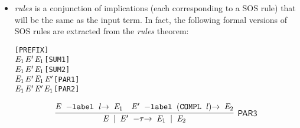 \begin{itemize}
  \item
\emph{rules} is a conjunction of implications (each
    corresponding to a SOS rule) that will be the
    same as the input term.
In fact, the following formal versions of SOS rules are
    extracted from the \emph{rules} theorem:
\begin{alltt}
\HOLTokenTurnstile{} \HOLSymConst{\ensuremath{\ldotp}} \HOLTokenTransBegin{}\HOLTokenTransEnd {}\hfill\texttt{[PREFIX]}
\HOLTokenTurnstile{}  \HOLTokenTransBegin{}\HOLTokenTransEnd \ensuremath{\HOLFreeVar{E}\sb{\mathrm{1}}} \HOLSymConst{\HOLTokenImp{}}  \HOLSymConst{\ensuremath{+}} \ensuremath{\HOLFreeVar{E}\sp{\prime}} \HOLTokenTransBegin{}\HOLTokenTransEnd \ensuremath{\HOLFreeVar{E}\sb{\mathrm{1}}}\hfill\texttt{[SUM1]}
\HOLTokenTurnstile{}  \HOLTokenTransBegin{}\HOLTokenTransEnd \ensuremath{\HOLFreeVar{E}\sb{\mathrm{1}}} \HOLSymConst{\HOLTokenImp{}} \ensuremath{\HOLFreeVar{E}\sp{\prime}} \HOLSymConst{\ensuremath{+}}  \HOLTokenTransBegin{}\HOLTokenTransEnd \ensuremath{\HOLFreeVar{E}\sb{\mathrm{1}}}\hfill\texttt{[SUM2]}
\HOLTokenTurnstile{}  \HOLTokenTransBegin{}\HOLTokenTransEnd \ensuremath{\HOLFreeVar{E}\sb{\mathrm{1}}} \HOLSymConst{\HOLTokenImp{}}  \HOLSymConst{\ensuremath{\mid}} \ensuremath{\HOLFreeVar{E}\sp{\prime}} \HOLTokenTransBegin{}\HOLTokenTransEnd \ensuremath{\HOLFreeVar{E}\sb{\mathrm{1}}} \HOLSymConst{\ensuremath{\mid}} \ensuremath{\HOLFreeVar{E}\sp{\prime}}\hfill\texttt{[PAR1]}
\HOLTokenTurnstile{}  \HOLTokenTransBegin{}\HOLTokenTransEnd \ensuremath{\HOLFreeVar{E}\sb{\mathrm{1}}} \HOLSymConst{\HOLTokenImp{}} \ensuremath{\HOLFreeVar{E}\sp{\prime}} \HOLSymConst{\ensuremath{\mid}}  \HOLTokenTransBegin{}\HOLTokenTransEnd \ensuremath{\HOLFreeVar{E}\sp{\prime}} \HOLSymConst{\ensuremath{\mid}} \ensuremath{\HOLFreeVar{E}\sb{\mathrm{1}}}\hfill\texttt{[PAR2]}
\end{alltt}
\begin{equation*}
\infer[\HOLRuleName{PAR3}]{\HOLinline{\HOLFreeVar{E} \HOLSymConst{\ensuremath{\mid}} \ensuremath{\HOLFreeVar{E}\sp{\prime}} \HOLTokenTransBegin\HOLSymConst{\ensuremath{\tau}}\HOLTokenTransEnd \ensuremath{\HOLFreeVar{E}\sb{\mathrm{1}}} \HOLSymConst{\ensuremath{\mid}} \ensuremath{\HOLFreeVar{E}\sb{\mathrm{2}}}}}{\HOLinline{\HOLFreeVar{E} \HOLTokenTransBegin\HOLConst{label} \HOLFreeVar{l}\HOLTokenTransEnd \ensuremath{\HOLFreeVar{E}\sb{\mathrm{1}}}}&\HOLinline{\ensuremath{\HOLFreeVar{E}\sp{\prime}} \HOLTokenTransBegin\HOLConst{label} \ensuremath{(}\HOLConst{COMPL} \HOLFreeVar{l}\ensuremath{)}\HOLTokenTransEnd \ensuremath{\HOLFreeVar{E}\sb{\mathrm{2}}}}}

\end{equation*}
\end{itemize}
